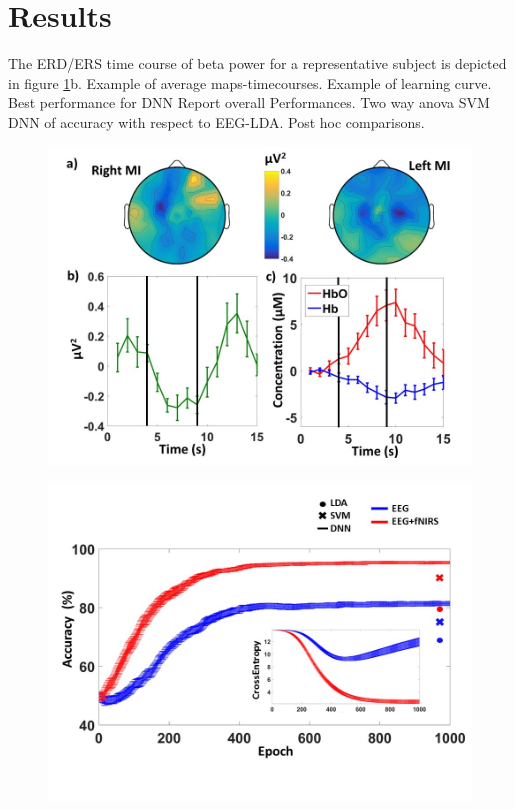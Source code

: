 \documentclass[12pt ]{iopart}
\begin{document}
\section{Results}
The ERD/ERS time course of beta power for a representative subject is depicted in figure \ref{fig:fig4}b.
Example of average maps-timecourses.
Example of learning curve.
Best performance for DNN
Report overall Performances.
Two way anova SVM DNN of accuracy with respect to EEG-LDA.
Post hoc comparisons.
\begin{figure}
	\includegraphics[width=\linewidth]{Diapositiva4.JPG}
	\caption{}
	\label{fig:fig4}
\end{figure}
\begin{figure}
	\includegraphics[width=\linewidth]{Diapositiva5.JPG}
	\caption{}
	\label{fig:fig5}
\end{figure}
\end{document}
